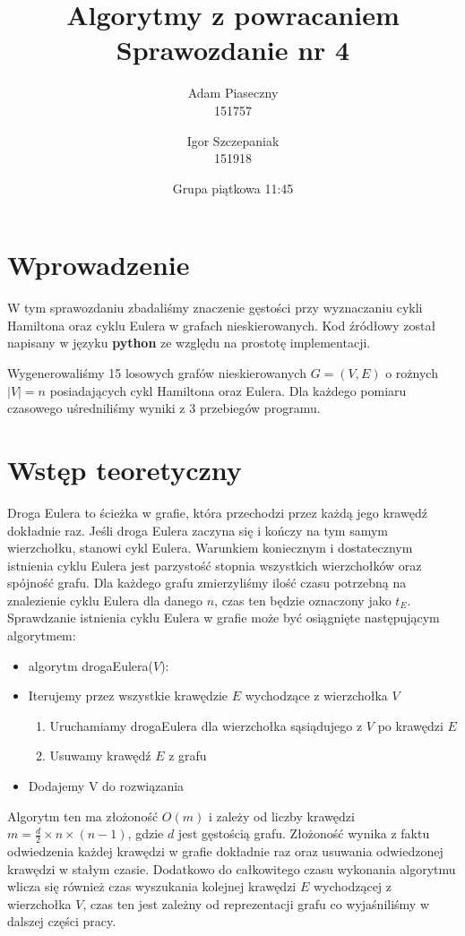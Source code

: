 \documentclass{article}
\title{\LARGE Algorytmy z powracaniem\\ Sprawozdanie nr 4}
\author{Adam Piaseczny \\	151757 \and
				Igor Szczepaniak \\ 151918}
\date{Grupa piątkowa 11:45}
\begin{document}
\maketitle
\pagebreak

\tableofcontents
\pagebreak

\section{Wprowadzenie}

W tym sprawozdaniu zbadaliśmy znaczenie gęstości przy wyznaczaniu cykli Hamiltona oraz cyklu Eulera w grafach nieskierowanych. Kod źródłowy został napisany w języku \textbf{python} ze względu na prostotę implementacji.

Wygenerowaliśmy 15 losowych grafów nieskierowanych $G=(V,E)$ o rożnych $|V|=n$ posiadających cykl Hamiltona oraz Eulera. Dla każdego pomiaru czasowego uśredniliśmy wyniki z 3 przebiegów programu.

\section{Wstęp teoretyczny}

Droga Eulera to ścieżka w grafie, która przechodzi przez każdą jego krawędź dokładnie raz. Jeśli droga Eulera zaczyna się i kończy na tym samym wierzchołku, stanowi cykl Eulera. Warunkiem koniecznym i dostatecznym istnienia cyklu Eulera jest parzystość stopnia wszystkich wierzchołków oraz spójność grafu. Dla każdego grafu zmierzyliśmy ilość czasu potrzebną na znalezienie cyklu Eulera dla danego $n$, czas ten będzie oznaczony jako $t_E$.  Sprawdzanie istnienia cyklu Eulera w grafie może być osiągnięte następującym algorytmem:

\begin{itemize}
	\item algorytm drogaEulera($V$):
	\item Iterujemy przez wszystkie krawędzie $E$ wychodzące z wierzchołka $V$
	\begin{enumerate}
		\item Uruchamiamy drogaEulera dla wierzchołka sąsiądujego z $V$ po krawędzi $E$
		\item Usuwamy krawędź $E$ z grafu
	\end{enumerate}
	\item Dodajemy V do rozwiązania
\end{itemize}

Algorytm ten ma złożoność $O(m)$ i zależy od liczby krawędzi $m=\frac{d}{2}\times n \times (n-1)$, gdzie $d$ jest gęstością grafu. Złożoność wynika z faktu odwiedzenia każdej krawędzi w grafie dokładnie raz oraz usuwania odwiedzonej krawędzi w stałym czasie. Dodatkowo do całkowitego czasu wykonania algorytmu wlicza się również czas wyszukania kolejnej krawędzi $E$ wychodzącej z wierzchołka $V$, czas ten jest zależny od reprezentacji grafu co wyjaśniliśmy w dalszej części pracy.
\end{document}
